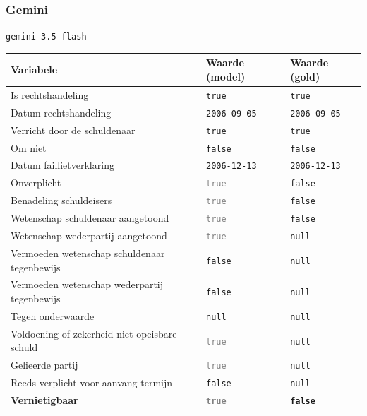 \documentclass[
  dutch,
  a4paper,
]{article}
\begin{document}
\newpage


\subsubsection{Gemini}\label{gemini-25}

\texttt{gemini-3.5-flash}

\begin{center}
\small
\begin{tabular}{@{}p{7.4cm}p{2.6cm}p{2.6cm}@{}}
\toprule
Variabele & Waarde (model) & Waarde (gold) \\
\midrule
Is rechtshandeling & \texttt{true} & \texttt{true} \\
Datum rechtshandeling & \texttt{2006-09-05} & \texttt{2006-09-05} \\
Verricht door de schuldenaar & \texttt{true} & \texttt{true} \\
Om niet & \texttt{false} & \texttt{false} \\
Datum faillietverklaring & \texttt{2006-12-13} & \texttt{2006-12-13} \\
Onverplicht & \textcolor{gray}{\texttt{true}} & \texttt{false} \\
Benadeling schuldeisers & \textcolor{gray}{\texttt{true}} & \texttt{false} \\
Wetenschap schuldenaar aangetoond & \textcolor{gray}{\texttt{true}} & \texttt{false} \\
Wetenschap wederpartij aangetoond & \textcolor{gray}{\texttt{true}} & \texttt{null} \\
Vermoeden wetenschap schuldenaar tegenbewijs & \texttt{false} & \texttt{null} \\
Vermoeden wetenschap wederpartij tegenbewijs & \texttt{false} & \texttt{null} \\
Tegen onderwaarde & \texttt{null} & \texttt{null} \\
Voldoening of zekerheid niet opeisbare schuld & \textcolor{gray}{\texttt{true}} & \texttt{null} \\
Gelieerde partij & \textcolor{gray}{\texttt{true}} & \texttt{null} \\
Reeds verplicht voor aanvang termijn & \texttt{false} & \texttt{null} \\
\textbf{Vernietigbaar} & \textbf{\textcolor{gray}{\texttt{true}}} & \textbf{\texttt{false}} \\
\bottomrule
\end{tabular}
\end{center}
\end{document}

